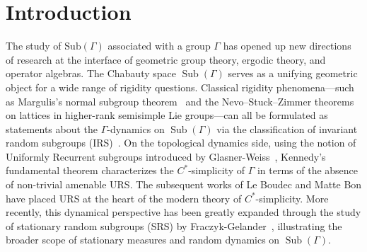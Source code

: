 \documentclass[12pt]{amsart} %
\theoremstyle{plain}
\theoremstyle{definition}
\DeclareMathOperator{\Sub}{Sub}
\begin{document}
\section{Introduction}
\label{sec:intro}
The study of $\text{Sub}(\Gamma)$ associated with a group $\Gamma$ has opened up new directions of research at the interface of geometric group theory, ergodic theory, and operator algebras. The Chabauty space $\Sub(\Gamma)$ serves as a unifying geometric object for a wide range of rigidity questions. Classical rigidity phenomena---such as Margulis's normal subgroup theorem~\cite{margulis1991discrete} and the Nevo--Stuck--Zimmer theorems~\cite{stuck1994stabilizers, nevo1994boundary, nevo1999homogenous} on lattices in higher-rank semisimple Lie groups---can all be formulated as statements about the $\Gamma$-dynamics on $\Sub(\Gamma)$ via the classification of invariant random subgroups (IRS)~\cite{abert2014kesten, Baderetal2016}. On the topological dynamics side, using the notion of Uniformly Recurrent subgroups introduced by Glasner-Weiss~\cite{glasner2015uniformly}, Kennedy's fundamental theorem \cite{Ke18} characterizes the $C^*$-simplicity of $\Gamma$ in terms of the absence of non-trivial amenable URS. The subsequent works of Le Boudec and Matte Bon \cite{le2018subgroup} have placed URS at the heart of the modern theory of $C^*$-simplicity. More recently, this dynamical perspective has been greatly expanded through the study of stationary random subgroups (SRS) by Fraczyk-Gelander~\cite{fraczyk2023infinite}, illustrating the broader scope of stationary measures and random dynamics on $\Sub(\Gamma)$.
\end{document}
